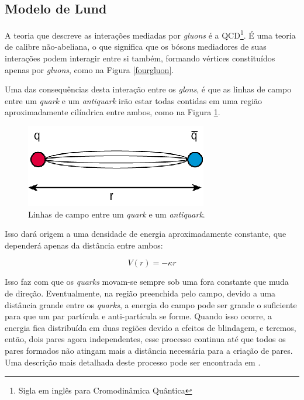 \subsection{Modelo de Lund}

A teoria que descreve as interações mediadas por \emph{gluons} é a
QCD\footnote{Sigla em inglês para Cromodinâmica Quântica}. É uma teoria
de calibre não-abeliana, o que significa que os bósons mediadores
de suas interações podem interagir entre si também, formando vértices
constituídos apenas por \emph{gluons}, como na Figura \ref{fourgluon}.



Uma das consequências desta interação entre os \emph{glons}, é que as linhas
de campo entre um \emph{quark} e um \emph{antiquark} irão estar todas contidas
em uma região aproximadamente cilíndrica entre ambos, como na Figura \ref{linhascampo}.

\begin{figure}[!h]
\centering
 \includegraphics[scale=0.5]{Introducao/gluonfield.png}
 \caption{Linhas de campo entre um \emph{quark} e um \emph{antiquark}.}
 \label{linhascampo}
\end{figure}

Isso dará origem a uma densidade de energia aproximadamente constante, que dependerá
apenas da distância entre ambos:

\begin{equation}
 V(r) = -\kappa r
\end{equation}

Isso faz com que os \emph{quarks} movam-se sempre sob uma fora constante que muda de direção.
Eventualmente, na região preenchida pelo campo, devido a uma distância grande entre os \emph{quarks},
a energia do campo pode ser grande o suficiente para que um par partícula e anti-partícula se forme.
Quando isso ocorre, a energia fica distribuída em duas regiões devido a efeitos de blindagem, e teremos,
então, dois pares agora independentes, esse processo continua até que todos os pares formados não atingam
mais a distância necessária para a criação de pares. Uma descrição mais detalhada deste processo pode ser
encontrada em \cite{bierlich_rope_2017,andersson_recent_2002,skands_introduction_2013}.